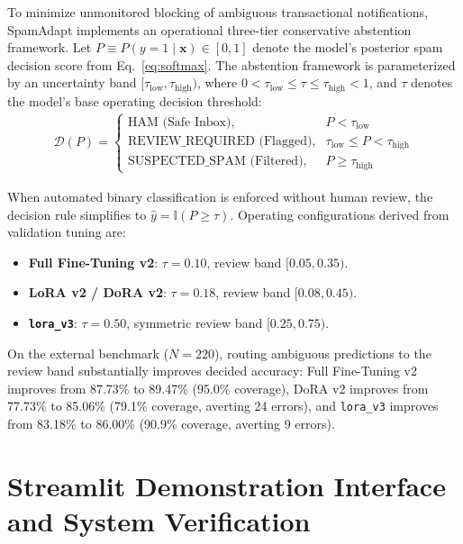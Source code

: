 \documentclass[conference]{IEEEtran}
\begin{document}
To minimize unmonitored blocking of ambiguous transactional notifications, SpamAdapt implements an operational three-tier conservative abstention framework. Let $P \equiv P(y=1 \mid \mathbf{x}) \in [0, 1]$ denote the model's posterior spam decision score from Eq.~\eqref{eq:softmax}. The abstention framework is parameterized by an uncertainty band $[\tau_{\text{low}}, \tau_{\text{high}})$, where $0 < \tau_{\text{low}} \le \tau \le \tau_{\text{high}} < 1$, and $\tau$ denotes the model's base operating decision threshold:
\begin{align}
    \mathcal{D}(P) = 
    \begin{cases}
        \text{HAM (Safe Inbox)}, & P < \tau_{\text{low}} \\
        \text{REVIEW\_REQUIRED (Flagged)}, & \tau_{\text{low}} \le P < \tau_{\text{high}} \\
        \text{SUSPECTED\_SPAM (Filtered)}, & P \ge \tau_{\text{high}}
    \end{cases}
    \label{eq:abstention}
\end{align}

When automated binary classification is enforced without human review, the decision rule simplifies to $\hat{y} = \mathbb{I}(P \ge \tau)$. Operating configurations derived from validation tuning are:
\begin{itemize}
    \item \textbf{Full Fine-Tuning v2}: $\tau = 0.10$, review band $[0.05, 0.35)$.
    \item \textbf{LoRA v2 / DoRA v2}: $\tau = 0.18$, review band $[0.08, 0.45)$.
    \item \textbf{\texttt{lora\_v3}}: $\tau = 0.50$, symmetric review band $[0.25, 0.75)$.
\end{itemize}

On the external benchmark ($N=220$), routing ambiguous predictions to the review band substantially improves decided accuracy: Full Fine-Tuning v2 improves from 87.73\% to 89.47\% (95.0\% coverage), DoRA v2 improves from 77.73\% to 85.06\% (79.1\% coverage, averting 24 errors), and \texttt{lora\_v3} improves from 83.18\% to 86.00\% (90.9\% coverage, averting 9 errors).

\section{Streamlit Demonstration Interface and System Verification}
\label{sec:demo_interface}
\end{document}
